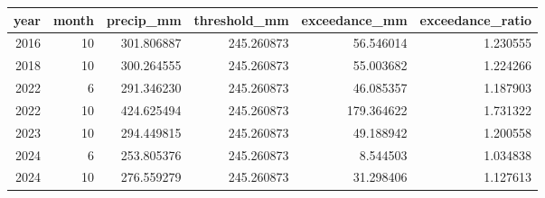 \begin{tabular}{rrrrrr}
\toprule
year & month & precip\_mm & threshold\_mm & exceedance\_mm & exceedance\_ratio \\
\midrule
2016 & 10 & 301.806887 & 245.260873 & 56.546014 & 1.230555 \\
2018 & 10 & 300.264555 & 245.260873 & 55.003682 & 1.224266 \\
2022 & 6 & 291.346230 & 245.260873 & 46.085357 & 1.187903 \\
2022 & 10 & 424.625494 & 245.260873 & 179.364622 & 1.731322 \\
2023 & 10 & 294.449815 & 245.260873 & 49.188942 & 1.200558 \\
2024 & 6 & 253.805376 & 245.260873 & 8.544503 & 1.034838 \\
2024 & 10 & 276.559279 & 245.260873 & 31.298406 & 1.127613 \\
\bottomrule
\end{tabular}

